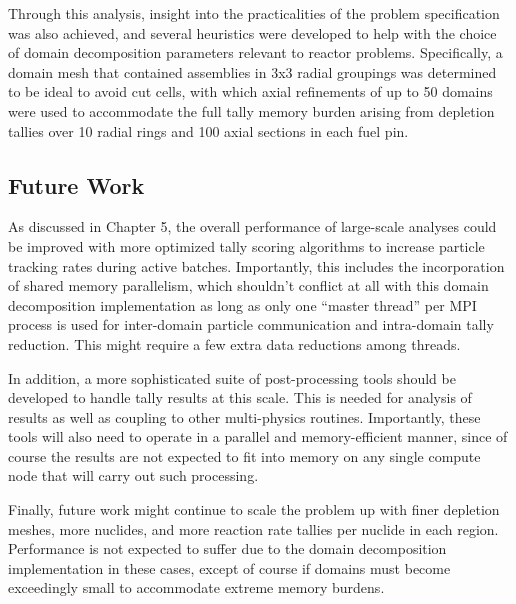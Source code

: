 Through this analysis, insight into the practicalities of the problem
specification was also achieved, and several heuristics were developed to help
with the choice of domain decomposition parameters relevant to reactor problems.
Specifically, a domain mesh that contained assemblies in 3x3 radial groupings
was determined to be ideal to avoid cut cells, with which axial refinements of
up to 50 domains were used to accommodate the full tally memory burden arising
from depletion tallies over 10 radial rings and 100 axial sections in each fuel
pin.

\subsection{Future Work}

As discussed in Chapter 5, the overall performance of large-scale analyses
could be improved with more optimized tally scoring algorithms to increase
particle tracking rates during active batches. Importantly, this includes the
incorporation of shared memory parallelism, which shouldn't conflict at all with
this domain decomposition implementation as long as only one ``master thread''
per MPI process is used for inter-domain particle communication and intra-domain
tally reduction. This might require a few extra data reductions among threads.

In addition, a more sophisticated suite of post-processing tools should be
developed to handle tally results at this scale. This is needed for analysis of
results as well as coupling to other multi-physics routines. Importantly, these
tools will also need to operate in a parallel and memory-efficient manner, since
of course the results are not expected to fit into memory on any single compute
node that will carry out such processing.

Finally, future work might continue to scale the problem up with finer
depletion meshes, more nuclides, and more reaction rate tallies per nuclide in
each region. Performance is not expected to suffer due to the domain
decomposition implementation in these cases, except of course if domains must
become exceedingly small to accommodate extreme memory burdens.

